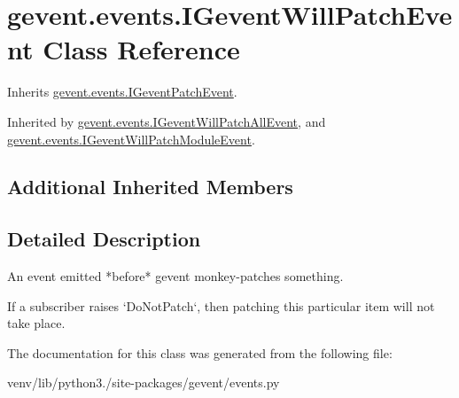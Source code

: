 \hypertarget{classgevent_1_1events_1_1_i_gevent_will_patch_event}{}\section{gevent.\+events.\+I\+Gevent\+Will\+Patch\+Event Class Reference}
\label{classgevent_1_1events_1_1_i_gevent_will_patch_event}


Inherits \hyperlink{classgevent_1_1events_1_1_i_gevent_patch_event}{gevent.\+events.\+I\+Gevent\+Patch\+Event}.



Inherited by \hyperlink{classgevent_1_1events_1_1_i_gevent_will_patch_all_event}{gevent.\+events.\+I\+Gevent\+Will\+Patch\+All\+Event}, and \hyperlink{classgevent_1_1events_1_1_i_gevent_will_patch_module_event}{gevent.\+events.\+I\+Gevent\+Will\+Patch\+Module\+Event}.

\subsection*{Additional Inherited Members}


\subsection{Detailed Description}
\begin{DoxyVerb}An event emitted *before* gevent monkey-patches something.

If a subscriber raises `DoNotPatch`, then patching this particular
item will not take place.
\end{DoxyVerb}
 

The documentation for this class was generated from the following file\+:\begin{DoxyCompactItemize}
\item 
venv/lib/python3./site-\/packages/gevent/events.\+py\end{DoxyCompactItemize}
